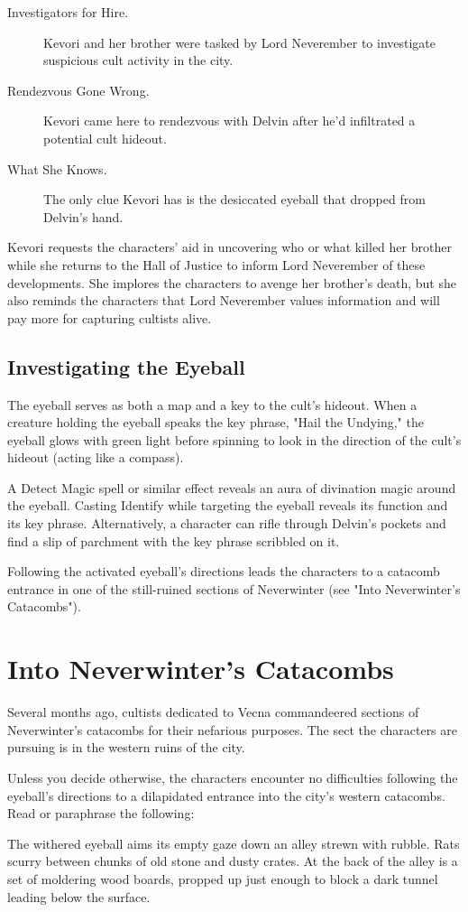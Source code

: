 \documentclass[10pt,a4paper,twoside,bg=print,twocolumn,openany,nodeprecatedcode]{dndbook}
\begin{document}
\begin{description}
  \item[Investigators for Hire.]
  Kevori and her brother were tasked by Lord Neverember to investigate suspicious cult activity in the city.
  \item[Rendezvous Gone Wrong.]
  Kevori came here to rendezvous with Delvin after he'd infiltrated a potential cult hideout.
  \item[What She Knows.]
  The only clue Kevori has is the desiccated eyeball that dropped from Delvin's hand.
\end{description}

Kevori requests the characters' aid in uncovering who or what killed her brother while she returns to the Hall of Justice to inform Lord Neverember of these developments. She implores the characters to avenge her brother's death, but she also reminds the characters that Lord Neverember values information and will pay more for capturing cultists alive.

\subsection{Investigating the Eyeball}
The eyeball serves as both a map and a key to the cult's hideout. When a creature holding the eyeball speaks the key phrase, "Hail the Undying," the eyeball glows with green light before spinning to look in the direction of the cult's hideout (acting like a compass).

A Detect Magic spell or similar effect reveals an aura of divination magic around the eyeball. Casting Identify while targeting the eyeball reveals its function and its key phrase. Alternatively, a character can rifle through Delvin's pockets and find a slip of parchment with the key phrase scribbled on it.

Following the activated eyeball's directions leads the characters to a catacomb entrance in one of the still-ruined sections of Neverwinter (see "Into Neverwinter's Catacombs").

\section{Into Neverwinter's Catacombs}
Several months ago, cultists dedicated to Vecna commandeered sections of Neverwinter's catacombs for their nefarious purposes. The sect the characters are pursuing is in the western ruins of the city.

Unless you decide otherwise, the characters encounter no difficulties following the eyeball's directions to a dilapidated entrance into the city's western catacombs. Read or paraphrase the following:
\begin{DndReadAloud}{}
The withered eyeball aims its empty gaze down an alley strewn with rubble. Rats scurry between chunks of old stone and dusty crates. At the back of the alley is a set of moldering wood boards, propped up just enough to block a dark tunnel leading below the surface.
\end{DndReadAloud}
\end{document}
